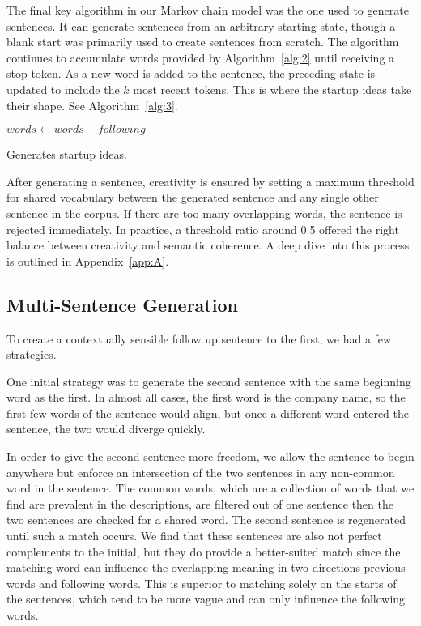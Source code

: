 \documentclass[11pt]{article}
\begin{document}
The final key algorithm in our Markov chain model was the one used to generate sentences. It can generate sentences from an arbitrary starting state, though a blank start was primarily used to create sentences from scratch. The algorithm continues to accumulate words provided by Algorithm~\ref{alg:2} until receiving a stop token. As a new word is added to the sentence, the preceding state is updated to include the \(k\) most recent tokens. This is where the startup ideas take their shape. See Algorithm~\ref{alg:3}.

\begin{algorithm}
  \begin{algorithmic}

        {$words \gets words + following$}
      \EndIf
    \EndWhile
    \EndProcedure{}
  \end{algorithmic}
  \caption{Generates startup ideas.}
  \label{alg:3}
\end{algorithm}

After generating a sentence, creativity is ensured by setting a maximum threshold for shared vocabulary between the generated sentence and any single other sentence in the corpus. If there are too many overlapping words, the sentence is rejected immediately. In practice, a threshold ratio around 0.5 offered the right balance between creativity and semantic coherence. A deep dive into this process is outlined in Appendix~\ref{app:A}.

\subsection{Multi-Sentence Generation}
To create a contextually sensible follow up sentence to the first, we had a few strategies. 

One initial strategy was to generate the second sentence with the same beginning word as the first. In almost all cases, the first word is the company name, so the first few words of the sentence would align, but once a different word entered the sentence, the two would diverge quickly. 

In order to give the second sentence more freedom, we allow the sentence to begin anywhere but enforce an intersection of the two sentences in any non-common word in the sentence. The common words, which are a collection of words that we find are prevalent in the descriptions, are filtered out of one sentence then the two sentences are checked for a shared word. The second sentence is regenerated until such a match occurs. We find that these sentences are also not perfect complements to the initial, but they do provide a better-suited match since the matching word can influence the overlapping meaning in two directions \textemdash previous words and following words. This is superior to matching solely on the starts of the sentences, which tend to be more vague and can only influence the following words. 
\end{document}
